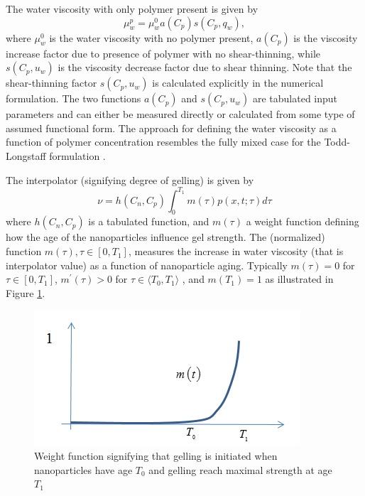 \documentclass[journal = enfuem, manuscript =  article]{achemso}
\begin{document}
The water viscosity with only polymer present is given by
\begin{equation}
    \mu_w^p=\mu_w^0 a(C_p) s(C_p, q_w),
\end{equation}
where $\mu_w^0$ is the water viscosity with no polymer present, $a (C_p)$ is the viscosity increase factor due to presence of polymer with no shear-thinning, while $s(C_p, u_w)$ is the viscosity decrease factor due to shear thinning. Note that the shear-thinning factor $s(C_p, u_w)$ is calculated explicitly in the numerical formulation. The two functions $a (C_p)$ and $s(C_p, u_w)$ are tabulated input parameters and can either be measured directly or calculated from some type of assumed functional form. The approach for defining the water viscosity as a function of polymer concentration resembles the fully mixed case for the Todd-Longstaff formulation \citep{slb2015}.   

The interpolator (signifying degree of gelling) is given by
\begin{equation} \label{eq:ageEffect} %
    \nu=h(C_n,C_p) \int^{T_1}_{0}m(\tau)p(x,t;\tau)d\tau
\end{equation}
where $h(C_n,C_p)$ is a tabulated function, and $m(\tau)$ a weight function defining how the age of the nanoparticles influence gel strength. The (normalized) function $m(\tau), \tau\in[0,T_1]$, measures the increase in water viscosity (that is interpolator value) as a function of nanoparticle aging. Typically $m(\tau)=0$ for $\tau\in[0,T_1]$,  $m^\prime(\tau)>0$ for $\tau\in\langle T_0, T_1\rangle$ , and $m(T_1)=1$ as illustrated in Figure \ref{fig:weightFunc}.

\begin{figure}[h]
    \centering
    \includegraphics[width=.85\textwidth]{fig/weightFunc.png}
    \caption{Weight function signifying that gelling is initiated when nanoparticles have age $T_0$ and gelling reach maximal strength at age $T_1$}
    \label{fig:weightFunc}
\end{figure}
\end{document}
